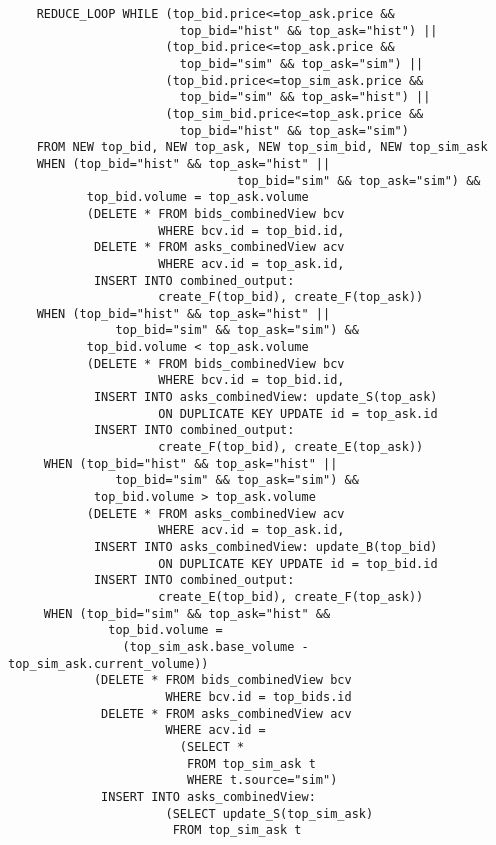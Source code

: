 \documentclass{article}
\begin{document}
\begin{verbatim}  
    REDUCE_LOOP WHILE (top_bid.price<=top_ask.price && 
                        top_bid="hist" && top_ask="hist") ||
                      (top_bid.price<=top_ask.price && 
                        top_bid="sim" && top_ask="sim") ||
                      (top_bid.price<=top_sim_ask.price && 
                        top_bid="sim" && top_ask="hist") ||
                      (top_sim_bid.price<=top_ask.price && 
                        top_bid="hist" && top_ask="sim")
    FROM NEW top_bid, NEW top_ask, NEW top_sim_bid, NEW top_sim_ask
    WHEN (top_bid="hist" && top_ask="hist" ||
                                top_bid="sim" && top_ask="sim") &&
           top_bid.volume = top_ask.volume
           (DELETE * FROM bids_combinedView bcv 
                     WHERE bcv.id = top_bid.id,
            DELETE * FROM asks_combinedView acv 
                     WHERE acv.id = top_ask.id,
            INSERT INTO combined_output:
                     create_F(top_bid), create_F(top_ask))
    WHEN (top_bid="hist" && top_ask="hist" ||
               top_bid="sim" && top_ask="sim") &&
           top_bid.volume < top_ask.volume                     
           (DELETE * FROM bids_combinedView bcv 
                     WHERE bcv.id = top_bid.id,
            INSERT INTO asks_combinedView: update_S(top_ask) 
                     ON DUPLICATE KEY UPDATE id = top_ask.id
            INSERT INTO combined_output: 
                     create_F(top_bid), create_E(top_ask))
     WHEN (top_bid="hist" && top_ask="hist" ||
               top_bid="sim" && top_ask="sim") &&
            top_bid.volume > top_ask.volume                     
           (DELETE * FROM asks_combinedView acv 
                     WHERE acv.id = top_ask.id,
            INSERT INTO asks_combinedView: update_B(top_bid) 
                     ON DUPLICATE KEY UPDATE id = top_bid.id
            INSERT INTO combined_output: 
                     create_E(top_bid), create_F(top_ask))
     WHEN (top_bid="sim" && top_ask="hist" &&
              top_bid.volume = 
                (top_sim_ask.base_volume - top_sim_ask.current_volume))
            (DELETE * FROM bids_combinedView bcv
                      WHERE bcv.id = top_bids.id
             DELETE * FROM asks_combinedView acv
                      WHERE acv.id = 
                        (SELECT *
                         FROM top_sim_ask t
                         WHERE t.source="sim")
             INSERT INTO asks_combinedView: 
                      (SELECT update_S(top_sim_ask)
                       FROM top_sim_ask t

\end{verbatim}
\end{document}
